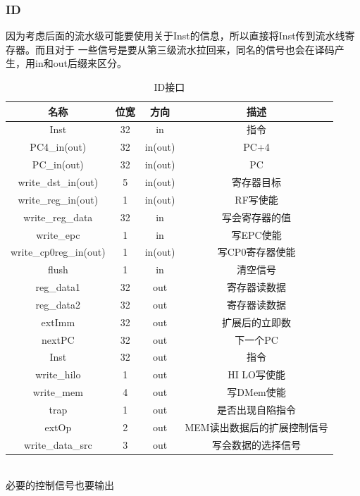\documentclass[UTF8]{ctexart}
\begin{document}
\subsubsection{ID}
因为考虑后面的流水级可能要使用关于Inst的信息，所以直接将Inst传到流水线寄存器。而且对于
一些信号是要从第三级流水拉回来，同名的信号也会在译码产生，用in和out后缀来区分。
\begin{table}[h]
    \centering
    \begin{tabular}{|c|c|c|c|}
        \hline  
        名称 & 位宽 & 方向 & 描述 \\ \hline
        Inst & 32 & in & 指令 \\ \hline
        PC4\_in(out) & 32 & in(out) & PC+4 \\ \hline
        PC\_in(out) & 32 & in(out) & PC  \\ \hline
        write\_dst\_in(out) & 5 & in(out) & 寄存器目标 \\ \hline
        write\_reg\_in(out) & 1 & in(out) & RF写使能 \\ \hline
        write\_reg\_data & 32 & in & 写会寄存器的值 \\ \hline 
        write\_epc & 1 &in & 写EPC使能 \\ \hline 
        write\_cp0reg\_in(out) & 1 & in(out) & 写CP0寄存器使能  \\ \hline
        flush & 1 & in & 清空信号 \\ \hline 
        reg\_data1 & 32 & out & 寄存器读数据 \\ \hline 
        reg\_data2 & 32 & out & 寄存器读数据 \\ \hline
        extImm & 32 & out & 扩展后的立即数 \\ \hline
        nextPC & 32 & out & 下一个PC \\ \hline
        Inst & 32 & out & 指令 \\ \hline
        write\_hilo & 1 & out & HI LO写使能 \\ \hline
        write\_mem & 4 & out & 写DMem使能 \\ \hline
        trap & 1 & out & 是否出现自陷指令 \\ \hline 
        extOp & 2 & out & MEM读出数据后的扩展控制信号 \\ \hline
        write\_data\_src & 3 & out & 写会数据的选择信号 \\ \hline
    \end{tabular}
    \caption{ID接口}
\end{table}\\
必要的控制信号也要输出
\end{document}
